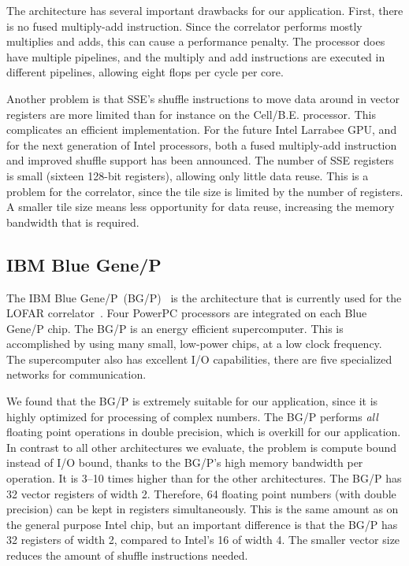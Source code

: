 \documentclass{article}
\begin{document}
The architecture has several important drawbacks for our application.
First, there is no fused multiply-add instruction.  Since the
correlator performs mostly multiplies and adds, this can cause a
performance penalty. The processor does have multiple pipelines, and
the multiply and add instructions are executed in different pipelines,
allowing eight flops per cycle per core.

Another problem is that SSE's shuffle instructions to move data around
in vector registers are more limited than for instance on the
\mbox{Cell/B.E.} processor. This complicates an efficient
implementation.  For the future Intel Larrabee GPU, and for the next
generation of Intel processors, both a fused multiply-add instruction
and improved shuffle support has been announced.  The number of SSE
registers is small (sixteen 128-bit registers), allowing only little
data reuse.  This is a problem for the correlator, since the tile size
is limited by the number of registers.  A smaller tile size means less
opportunity for data reuse, increasing the memory bandwidth that is
required.


\subsection{IBM Blue Gene/P}

The IBM Blue Gene/P~(BG/P)~\cite{bgp} is the architecture that is
currently used for the LOFAR correlator~\cite{sc09}.  Four PowerPC
processors are integrated on each Blue Gene/P chip.  The BG/P is an
energy efficient supercomputer. This is accomplished by using many
small, low-power chips, at a low clock frequency.  The supercomputer
also has excellent I/O capabilities, there are five specialized
networks for communication.

We found that the BG/P is extremely suitable for our application,
since it is highly optimized for processing of complex numbers.  The
BG/P performs \emph{all} floating point operations in double
precision, which is overkill for our application.  In contrast to all
other architectures we evaluate, the problem is compute bound instead
of I/O bound, thanks to the BG/P's high memory bandwidth per
operation. It is 3--10 times higher than for the other architectures.
The BG/P has 32 vector registers of width 2.  Therefore, 64 floating
point numbers (with double precision) can be kept in registers
simultaneously. This is the same amount as on the general purpose
Intel chip, but an important difference is that the BG/P has 32
registers of width 2, compared to Intel's 16 of width 4.  The smaller
vector size reduces the amount of shuffle instructions needed.
\end{document}

